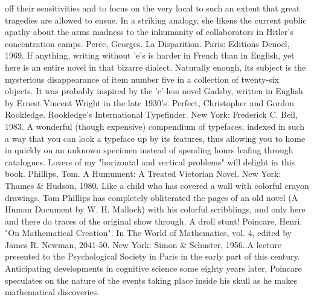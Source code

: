   off their sensitivities and to focus on the very local to such an extent that great tragedies are
  allowed to ensue. In a striking analogy, she likens the current public apathy about the arms
  madness to the inhumanity of collaborators in Hitler's concentration camps.
Perec, Georges. La Disparition. Paris: Editions Denoel, 1969. If anything, writing without 'e's
  is harder in French than in English, yet here is an entire novel in that bizarre dialect.
  Naturally enough, its subject is the mysterious disappearance of item number five in a
  collection of twenty-six objects. It was probably inspired by the 'e'-less novel Gadsby,
  written in English by Ernest Vincent Wright in the late 1930's.
Perfect, Christopher and Gordon Rookledge. Rookledge's International Typefinder. New
  York: Frederick C. Beil, 1983. A wonderful (though expensive) compendium of typefaces,
  indexed in such a way that you can look a typeface up by its features, thus allowing you to
  home in quickly on an unknown specimen instead of spending hours leafing through
  catalogues. Lovers of my "horizontal and vertical problems" will delight in this book.
Phillips, Tom. A Humument: A Treated Victorian Novel. New York: Thames \& Hudson,
  1980. Like a child who has covered a wall with colorful crayon drawings, Tom Phillips has
  completely obliterated the pages of an old novel (A Human Document by W. H. Mallock)
  with his colorful scribblings, and only here and there do traces of the original show through.
  A droll stunt!
Poincare, Henri. "On Mathematical Creation". In The World of Mathematics, vol. 4, edited by
  James R. Newman, 2041-50. New York: Simon \& Schuster, 1956..A lecture presented to
  the Psychological Society in Paris in the early part of this century. Anticipating
  developments in cognitive science some eighty years later, Poincare speculates on the
  nature of the events taking place inside his skull as he makes mathematical discoveries.


